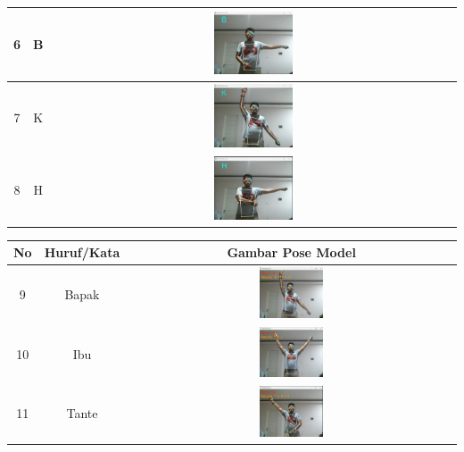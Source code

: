 \begin{table}[h]
\begin{tabular}{|c|c|c|}
		\hline
		6 & B & \includegraphics[width=0.2\textwidth]{gambar/bener/HurufB_ModelCNN2_Dawe.png} \\
		\hline
		7 & K & \includegraphics[width=0.2\textwidth]{gambar/bener/HurufK_ModelCNN2_Dawe.png} \\
		\hline
		8 & H & \includegraphics[width=0.2\textwidth]{gambar/bener/HurufH_ModelCNN2_Dawe.png} \\
		\hline
		\end{tabular}
		\end{table}

		\begin{table}[h]
			\centering
			\begin{tabular}{|c|c|c|}
				\hline
				No & Huruf/Kata & Gambar Pose Model  \\
				\hline
				9 & Bapak & \includegraphics[width=0.2\textwidth]{gambar/bener/HurufBapak_CNN2_Dawe.png} \\
				\hline
				10 & Ibu & \includegraphics[width=0.2\textwidth]{gambar/bener/HurufIbu_ModelCNN2_Dawe.png} \\
				\hline
				11 & Tante & \includegraphics[width=0.2\textwidth]{gambar/bener/HurufTante_ModelCNN2_Dawe.png} \\
				\hline
			\end{tabular}
		\end{table}

